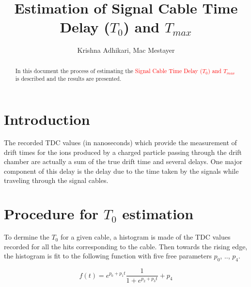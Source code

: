 \documentclass[12pt,epsfig]{article}
\def\t0{$T_0$ }
\begin{document}
\title{Estimation of Signal Cable Time Delay ($T_0$) and $T_{max}$}
\author{Krishna Adhikari, Mac Mestayer}

\maketitle

\begin{abstract}
In this document the process of estimating the \textcolor{red}{Signal Cable Time Delay ($T_0$) and $T_{max}$} 
is described and the results are presented. %
\end{abstract}


\section{Introduction}

The recorded TDC values (in nanoseconds) which provide the measurement of drift times for the ions produced by a charged particle passing through the drift chamber are actually a sum of the true drift time and several delays. One major component of this delay is the delay due to the time taken by the signals while traveling through the signal cables.


\section{Procedure for \t0 estimation}
To dermine the $T_0$ for a given cable, a histogram is made of the TDC values recorded for all the hits corresponding to the cable. Then towards the rising edge, the histogram is fit to the following function with five free parameters $p_0$, .., $p_4$.



\begin{equation}
    \label{T0fit}
    f(t) = e^{p_0 + p_1t} \frac{1}{1 + e^{p_2 + p_3t}}  + p_4
\end{equation}
\end{document}
